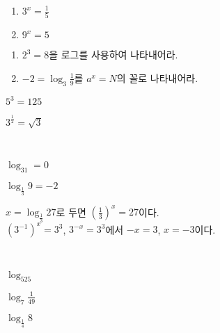 \documentclass{oblivoir}
\begin{document}
%
\begin{enumerate}\label{log6}
\item
\(3^x=\frac15\)
\item
\(9^x=5\)
\end{enumerate}

%
\exam{}
\begin{enumerate}\label{log7}
\item
\(2^3=8\)을 로그를 사용하여 나타내어라.
\item
\(-2=\log_3{\frac19}\)를 \(a^x=N\)의 꼴로 나타내어라.
\end{enumerate}

%
\label{log8}
\par\noindent
\begin{enumerate*}[itemjoin=\tabto{.5\textwidth}]
\item
\(5^3=125\)
\item
\(3^{\frac12}=\sqrt3\)
\end{enumerate*}

%
\label{log9}
\\
\begin{enumerate*}[itemjoin=\tabto{.5\textwidth}]
\item
\(\log_31=0\)
\item
\(\log_{\frac13}9=-2\)
\end{enumerate*}

\bigskip\bigskip
%
\label{log10}
\begin{mdframed}
\(x=\log_{\frac13}27\)로 두면 \((\frac13)^x=27\)이다.\\
\((3^{-1})^x=3^3\), \(3^{-x}=3^3\)에서 \(-x=3\), \(x=-3\)이다.
\end{mdframed}

%
\label{log11}
\\
\begin{enumerate*}[itemjoin=\qquad\qquad\qquad]
\item
\(\log_525\)
\item
\(\log_7{\frac1{49}}\)
\item
\(\log_{\frac14}8\)
\end{enumerate*}
\end{document}
